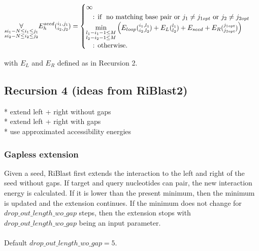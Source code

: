 \begin{equation*}
\underset{\substack{si_{1}-N \le i_{1} \le j_{1}\\si_{2}-N \le i_{2} \le j_{2}}}{\forall}\\
E_{h}^{seed}(\substack{i_1, j_1\\i_2, j_2}) = \begin{cases}
\infty\\
\quad\text{: if } \text{ no matching base pair or $j_1 \neq j_{1opt}$ or $j_2 \neq j_{2opt}$ }\\
\min\limits_{\substack{l_{1} - i_{1} - 1 \le M\\l_{2} - i_{2} - 1 \le M}}
\begin{pmatrix}
E_{loop}(\substack{i_1,l_1\\i_2,l_2}) + E_{L}(\substack{l_1\\l_2}) + E_{seed} + E_{R}(\substack{j_{1opt}\\j_{2opt}})
\end{pmatrix}\\
\quad\text{: otherwise.}\\

\end{cases}
\end{equation*}

with $E_{L}$ and $E_{R}$ defined as in Recursion 2.\\

\clearpage

\subsection{Recursion 4 (ideas from RiBlast2)}

* extend left + right without gaps\\
* extend left + right with gaps\\
* use approximated accessibility energies\\

\subsubsection{Gapless extension}

Given a seed, RiBlast first extends the interaction to the left and right of the seed without gaps.
If target and query nucleotides can pair, the new interaction energy is calculated. If it is lower than the present minimum, then the minimum is updated and the extension continues. If the minimum does not change for $drop\_out\_length\_wo\_gap$ steps, then the extension stops with $drop\_out\_length\_wo\_gap$ being an input parameter.
\\\\
Default $drop\_out\_length\_wo\_gap = 5$.

